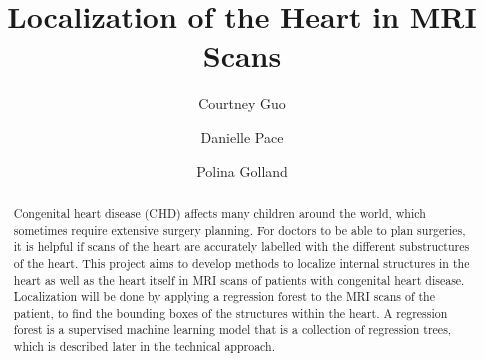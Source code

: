 \documentclass[sigconf,12pt]{acmart}
\begin{document}
\title{Localization of the Heart in MRI Scans}

\author{Courtney Guo}

\author{Danielle Pace}

\author{Polina Golland}


\begin{abstract}
\doublespacing
Congenital heart disease (CHD) affects many children around the world, which sometimes require extensive surgery planning. For doctors to be able to plan surgeries, it is helpful if scans of the heart are accurately labelled with the different substructures of the heart. This project aims to develop methods to localize internal structures in the heart as well as the heart itself in MRI scans of patients with congenital heart disease. Localization will be done by applying a regression forest to the MRI scans of the patient, to find the bounding boxes of the structures within the heart. A regression forest is a supervised machine learning model that is a collection of regression trees, which is described later in the technical approach. %
\end{abstract}


\maketitle

\begin{doublespacing}



\end{doublespacing}



\end{document}
